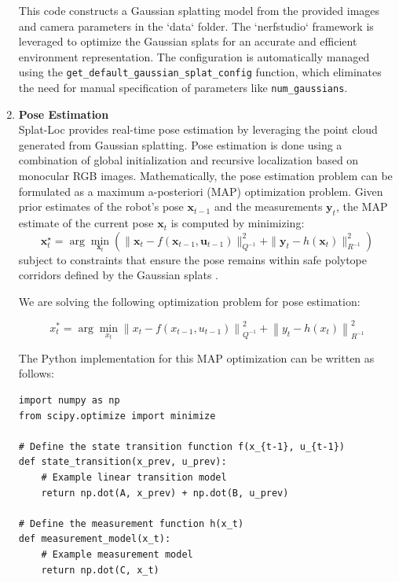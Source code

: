 \begin{enumerate}
            This code constructs a Gaussian splatting model from the provided images and
            camera parameters in the `data` folder. The `nerfstudio` framework is leveraged
            to optimize the Gaussian splats for an accurate and efficient environment
            representation. The configuration is automatically managed using the
            \texttt{get\_default\_gaussian\_splat\_config} function, which eliminates the
            need for manual specification of parameters like \texttt{num\_gaussians}.

      \item \textbf{Pose Estimation} \\
            Splat-Loc provides real-time pose estimation by leveraging the point cloud generated from Gaussian splatting. Pose estimation is done using a combination of global initialization and recursive localization based on monocular RGB images. Mathematically, the pose estimation problem can be formulated as a maximum a-posteriori (MAP) optimization problem. Given prior estimates of the robot's pose $\mathbf{x}_{t-1}$ and the measurements $\mathbf{y}_t$, the MAP estimate of the current pose $\mathbf{x}_t$ is computed by minimizing:
            \[
                  \mathbf{x}_t^\star = \arg\min_{\mathbf{x}_t} \left( \| \mathbf{x}_t - f(\mathbf{x}_{t-1}, \mathbf{u}_{t-1}) \|_{Q^{-1}}^2 + \| \mathbf{y}_t - h(\mathbf{x}_t) \|_{R^{-1}}^2 \right)
            \]
            subject to constraints that ensure the pose remains within safe polytope
            corridors defined by the Gaussian splats \cite{bortolon20246dgs6dposeestimation}
            \cite{chen2024splatnavsaferealtimerobot}.

            We are solving the following optimization problem for pose estimation:

            \[
                  x^*_t = \arg \min_{x_t} \left\| x_t - f(x_{t-1}, u_{t-1}) \right\|^2_{Q^{-1}} + \left\| y_t - h(x_t) \right\|^2_{R^{-1}}
            \]

            The Python implementation for this MAP optimization can be written as follows:

            \begin{lstlisting}
import numpy as np
from scipy.optimize import minimize

# Define the state transition function f(x_{t-1}, u_{t-1})
def state_transition(x_prev, u_prev):
    # Example linear transition model
    return np.dot(A, x_prev) + np.dot(B, u_prev)

# Define the measurement function h(x_t)
def measurement_model(x_t):
    # Example measurement model
    return np.dot(C, x_t)


\end{lstlisting}
\end{enumerate}
